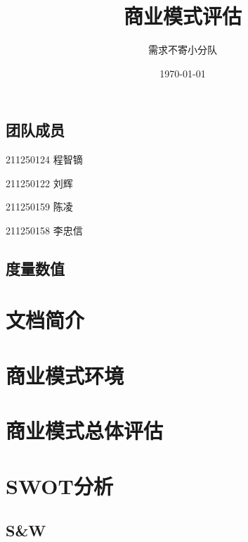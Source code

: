 \documentclass[a4paper,12pt]{article}
\title{商业模式评估}
\author{需求不寄小分队}
\date{\today}
\begin{document}
    \maketitle

    \tableofcontents


    \subsection{团队成员}
    211250124 程智镝

    211250122 刘辉

    211250159 陈凌

    211250158 李忠信
    \subsection{度量数值}

    \section{文档简介}
    

    \section{商业模式环境}
    
    
    \section{商业模式总体评估}
    

    \section{SWOT分析}
    \subsection{S\&W}
\end{document}
